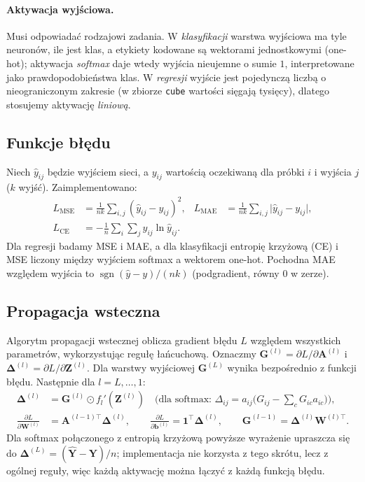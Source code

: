 \documentclass[11pt,a4paper]{article}
\newcommand{\mat}[1]{\mathbf{#1}}
\newcommand{\hadamard}{\odot}
\begin{document}
	\paragraph{Aktywacja wyjściowa.} Musi odpowiadać rodzajowi zadania. W \emph{klasyfikacji} warstwa wyjściowa ma tyle neuronów, ile jest klas, a etykiety kodowane są wektorami jednostkowymi (one-hot); aktywacja \emph{softmax} daje wtedy wyjścia nieujemne o sumie $1$, interpretowane jako prawdopodobieństwa klas. W \emph{regresji} wyjście jest pojedynczą liczbą o nieograniczonym zakresie (w zbiorze \texttt{cube} wartości sięgają tysięcy), dlatego stosujemy aktywację \emph{liniową}.
	
	\subsection{Funkcje błędu}
	Niech $\hat y_{ij}$ będzie wyjściem sieci, a $y_{ij}$ wartością oczekiwaną dla próbki $i$ i wyjścia $j$ ($k$ wyjść). Zaimplementowano:
	\begin{align}
		L_{\mathrm{MSE}} &= \frac{1}{nk}\sum_{i,j}(\hat y_{ij}-y_{ij})^2, &
		L_{\mathrm{MAE}} &= \frac{1}{nk}\sum_{i,j}\lvert\hat y_{ij}-y_{ij}\rvert, \\
		L_{\mathrm{CE}} &= -\frac{1}{n}\sum_{i}\sum_{j} y_{ij}\ln \hat y_{ij}. & &
	\end{align}
	Dla regresji badamy MSE i MAE, a dla klasyfikacji entropię krzyżową (CE) i MSE liczony między wyjściem softmax a wektorem one-hot. Pochodna MAE względem wyjścia to $\operatorname{sgn}(\hat y-y)/(nk)$ (podgradient, równy $0$ w zerze).
	
	\subsection{Propagacja wsteczna}
	Algorytm propagacji wstecznej \cite{rumelhart1986} oblicza gradient błędu $L$ względem wszystkich parametrów, wykorzystując regułę łańcuchową. Oznaczmy $\mat G^{(l)}=\partial L/\partial\mat A^{(l)}$ i $\mat\Delta^{(l)}=\partial L/\partial\mat Z^{(l)}$. Dla warstwy wyjściowej $\mat G^{(L)}$ wynika bezpośrednio z funkcji błędu. Następnie dla $l=L,\dots,1$:
	\begin{align}
		\mat\Delta^{(l)} &= \mat G^{(l)}\hadamard f_l'\!\left(\mat Z^{(l)}\right)
		\quad\text{(dla softmax: } \Delta_{ij}=a_{ij}\bigl(G_{ij}-\textstyle\sum_c G_{ic}a_{ic}\bigr)\text{)},\\
		\frac{\partial L}{\partial\mat W^{(l)}} &= \mat A^{(l-1)\top}\mat\Delta^{(l)}, \qquad
		\frac{\partial L}{\partial\mat b^{(l)}} = \mat 1^{\top}\mat\Delta^{(l)}, \qquad
		\mat G^{(l-1)} = \mat\Delta^{(l)}\mat W^{(l)\top}.
	\end{align}
	Dla softmax połączonego z entropią krzyżową powyższe wyrażenie upraszcza się do $\mat\Delta^{(L)}=(\hat{\mat Y}-\mat Y)/n$; implementacja nie korzysta z tego skrótu, lecz z ogólnej reguły, więc każdą aktywację można łączyć z każdą funkcją błędu.
	
\end{document}
